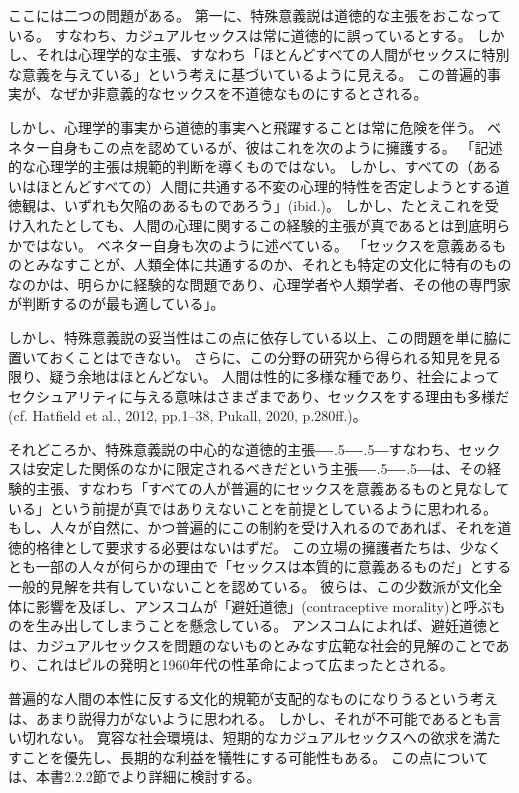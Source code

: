 \documentclass[paper=a4,book,openany]{jlreq}
\def\DDASH{―\kern-.5\zw―\kern-.5\zw―} %
\begin{document}
ここには二つの問題がある。
第一に、特殊意義説は道徳的な主張をおこなっている。
すなわち、カジュアルセックスは常に道徳的に誤っているとする。
しかし、それは心理学的な主張、すなわち「ほとんどすべての人間がセックスに特別な意義を与えている」という考えに基づいているように見える。
この普遍的事実が、なぜか非意義的なセックスを不道徳なものにするとされる。

しかし、心理学的事実から道徳的事実へと飛躍することは常に危険を伴う。
ベネター自身もこの点を認めているが、彼はこれを次のように擁護する。
「記述的な心理学的主張は規範的判断を導くものではない。
しかし、すべての（あるいはほとんどすべての）人間に共通する不変の心理的特性を否定しようとする道徳観は、いずれも欠陥のあるものであろう」(ibid.)。
しかし、たとえこれを受け入れたとしても、人間の心理に関するこの経験的主張が真であるとは到底明らかではない。
ベネター自身も次のように述べている。
「セックスを意義あるものとみなすことが、人類全体に共通するのか、それとも特定の文化に特有のものなのかは、明らかに経験的な問題であり、心理学者や人類学者、その他の専門家が判断するのが最も適している」\citep[p.198]{benatar02:_two_views_sexual_ethic}。

しかし、特殊意義説の妥当性はこの点に依存している以上、この問題を単に脇に置いておくことはできない。
さらに、この分野の研究から得られる知見を見る限り、疑う余地はほとんどない。
人間は性的に多様な種であり、社会によってセクシュアリティに与える意味はさまざまであり、セックスをする理由も多様だ(cf. Hatfield et al., 2012, pp.1--38, Pukall, 2020, p.280ff.)\nocite{hatfield12:_cultur_social_gender}\nocite{pukall20:_human_sexual}。

それどころか、特殊意義説の中心的な道徳的主張{\DDASH}すなわち、セックスは安定した関係のなかに限定されるべきだという主張{\DDASH}は、その経験的主張、すなわち「すべての人が普遍的にセックスを意義あるものと見なしている」という前提が真ではありえないことを前提としているように思われる。
もし、人々が自然に、かつ普遍的にこの制約を受け入れるのであれば、それを道徳的格律として要求する必要はないはずだ。
この立場の擁護者たちは、少なくとも一部の人々が何らかの理由で「セックスは本質的に意義あるものだ」とする一般的見解を共有していないことを認めている。
彼らは、この少数派が文化全体に影響を及ぼし、アンスコムが「避妊道徳」(contraceptive morality)と呼ぶものを生み出してしまうことを懸念している。
アンスコムによれば、避妊道徳とは、カジュアルセックスを問題のないものとみなす広範な社会的見解のことであり、これはピルの発明と1960年代の性革命によって広まったとされる。

普遍的な人間の本性に反する文化的規範が支配的なものになりうるという考えは、あまり説得力がないように思われる。
しかし、それが不可能であるとも言い切れない。
寛容な社会環境は、短期的なカジュアルセックスへの欲求を満たすことを優先し、長期的な利益を犠牲にする可能性もある。
この点については、本書2.2.2節でより詳細に検討する。
\end{document}
